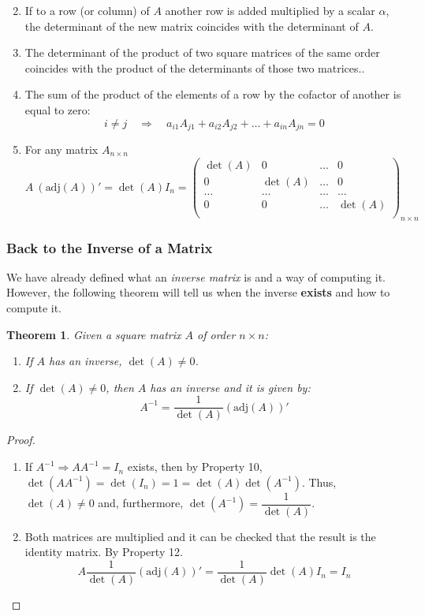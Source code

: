 \documentclass[a4paper,11pt]{article}
\theoremstyle{definition}
\theoremstyle{plain}
\newtheorem{theorem}{Theorem}
\begin{document}
\begin{enumerate}
\[  \]
\item
  If to a row (or column) of \(A\) another row is added multiplied by a
  scalar \(\alpha\), the determinant of the new matrix coincides with
  the determinant of \(A\).
\item
  The determinant of the product of two square matrices of the same
  order coincides with the product of the determinants of those two
  matrices..
\item
  The sum of the product of the elements of a row by the cofactor of
  another is equal to zero: \[
  i \neq j \quad \Rightarrow \quad a_{i1} A_{j1} + a_{i2} A_{j2} + \ldots + a_{in} A_{jn} = 0
  \]
\item
  For any matrix \(A_{n\times n}\) \[
  A \: \left(  \text{adj}(A) \right)' = \det(A) I_n = 
  \begin{pmatrix} \det(A) & 0 & \ldots & 0 \\ 0 & \det(A) & \ldots & 0 \\ \ldots & \ldots & \ldots & \ldots \\ 0 & 0 & \ldots & \det(A) \\ \end{pmatrix}_{n \times n}
  \]
\end{enumerate}

\subsubsection{Back to the Inverse of a
Matrix}\label{back-to-the-inverse-of-a-matrix}

We have already defined what an \emph{inverse matrix} is and a way of
computing it. However, the following theorem will tell us when the
inverse \textbf{exists} and how to compute it.

\begin{theorem}
Given a square matrix \(A\) of order \(n\times n\): 
\begin{enumerate}
    \item If \(A\) has an inverse, \(\det(A) \neq 0\). 

    \item If \(\det(A) \neq 0\), then \(A\) has an inverse and it is given by: 
    \[
    A^{-1} = \frac{1}{\det(A)}\left(\text{adj}(A)\right)'
    \]
\end{enumerate}
\end{theorem}

\begin{proof}
\begin{enumerate}
    \item If \(A^{-1}\Rightarrow AA^{-1} = I_n\) exists, then by Property 10, \(\det(AA^{-1}) = \det(I_n) = 1 = \det(A)\det\left(A^{-1}\right)\). Thus, \(\det(A)\neq 0\) and, furthermore, \(\det\left(A^{-1}\right) = \dfrac{1}{\det(A)}\). 

    \item Both matrices are multiplied and it can be checked that the result is the identity matrix. By Property 12. 
    \[ 
    A\frac{1}{\det(A)}(\text{adj}(A))' = \frac{1}{\det(A)}\det(A) I_n = I_n
    \]
\end{enumerate}
\end{proof}
\end{document}
